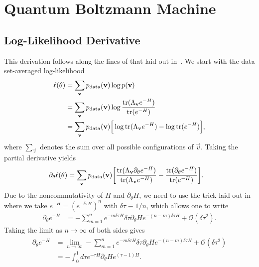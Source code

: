 \chapter{Quantum Boltzmann Machine}
\section{Log-Likelihood Derivative}\label{app:qbm_log_likelihood_derivation}
This derivation follows along the lines of that laid out in~\cite{amin_2018}.
We start with the data set-averaged log-likelihood
\begin{align}
\begin{split}
    \ell(\theta)
        &= \sum_{\mathbf{v}} p_{\text{data}}(\mathbf{v}) \log p(\mathbf{v}) \\
        &= \sum_{\mathbf{v}} p_{\text{data}}(\mathbf{v}) \log \frac{\text{tr}(\Lambda_{\mathbf{v}} e^{-H})}{\text{tr}(e^{-H})} \\
        &= \sum_{\mathbf{v}} p_{\text{data}}(\mathbf{v}) \Big[ \log\text{tr}(\Lambda_{\mathbf{v}} e^{-H}) - \log\text{tr}(e^{-H}) \Big],
\end{split}
\end{align}
where \( \sum_{\vec{v}} \) denotes the sum over all possible configurations of \( \vec{v} \).
Taking the partial derivative yields
\begin{align}
    \label{eq:qbm_log_likelihood_derivative}
    \partial_\theta \ell(\theta)
        &= \sum_{\mathbf{v}} p_{\text{data}}(\mathbf{v}) \bigg[ \frac{\text{tr}(\Lambda_{\mathbf{v}} \partial_\theta e^{-H})}{\text{tr}(\Lambda_{\mathbf{v}} e^{-H})} - \frac{\text{tr}(\partial_\theta e^{-H})}{\text{tr}(e^{-H})} \bigg].
\end{align}
Due to the noncommutativity of \( H \) and \( \partial_\theta H \), we need to use the trick laid out in~\cite{amin_2018} where we take \( e^{-H} = (e^{-\delta\tau H})^n \) with \( \delta\tau \equiv 1 / n \), which allows one to write
\begin{align}
    \partial_\theta e^{-H}
        &= -\sum_{m=1}^{n} e^{-m\delta\tau H} \delta\tau \partial_\theta He^{-(n-m)\delta\tau H} + \mathcal{O}(\delta\tau^2).
\end{align}
Taking the limit as \( n \rightarrow \infty \) of both sides gives
\begin{align}
\begin{split}
    \partial_\theta e^{-H}
        &= \lim_{n\rightarrow\infty} -\sum_{m=1}^{n} e^{-m\delta\tau H} \delta\tau \partial_\theta He^{-(n-m)\delta\tau H} + \mathcal{O}(\delta\tau^2) \\
        &= -\int_{0}^{1} d\tau e^{-\tau H} \partial_\theta H e^{(\tau-1)H}.
\end{split}
\end{align}
